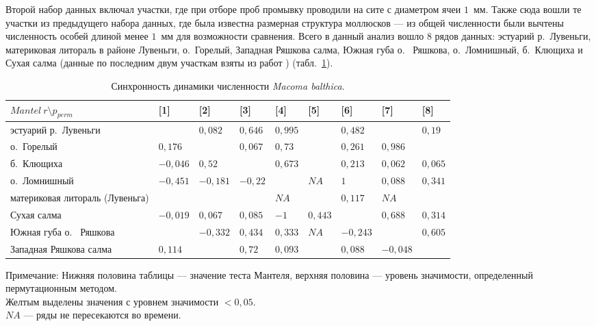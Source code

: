 Второй набор данных включал участки, где при отборе проб промывку проводили на сите с диаметром ячеи $1$~мм.
Также сюда вошли те участки из предыдущего набора данных, где была известна размерная структура моллюсков --- из общей численности были вычтены численность особей длиной менее $1$~мм для возможности сравнения.
Всего в данный анализ вошло 8 рядов данных: эстуарий р.~Лувеньги, материковая литораль в районе Лувеньги, о.~Горелый, Западная Ряшкова салма, Южная губа о.~ Ряшкова, о.~Ломнишный, б.~Клющиха и Сухая салма (данные по последним двум участкам взяты из работ \cite{Maximovich_et_al_1991, Maximovich_Gerasimova_2004, Gerasimova_Maximovich_2013}) (табл.~\ref{tab:Mantel_dynamic_N2}).
	\begin{table}[p]
	\caption{Синхронность динамики численности {\it Macoma balthica}.}
	\label{tab:Mantel_dynamic_N2}
        \begin{tabularx}{\textwidth}{|p{}|*{8}{X|}} \hline
	$Mantel \ r \setminus p_{perm}$ & [1] & [2] & [3] & [4] & [5] & [6] & [7] & [8]
	\\ \hline
	[1] эстуарий р.~Лувеньги & & $0,082$ & $0,646$ & $0,995$ & \cellcolor{yellow}{$0,029$} & $0,482$ & \cellcolor{yellow}{$0,013$} & $0,19$
	\\ \hline
	[2] о.~Горелый & $0,176$ &  & $0,067$ & $0,73$ & \cellcolor{yellow}{$0,001$} & $0,261$ & $0,986$ & \cellcolor{yellow}{$0,001$}
	\\ \hline
	[3] б.~Клющиха & $-0,046$ & $0,52$ &  & $0,673$ & \cellcolor{yellow}{$0,034$} & $0,213$ & $0,062$ & $0,065$
	\\ \hline
	[4] о.~Ломнишный & $-0,451$ & $-0,181$ & $-0,22$ &  & $NA$ & $1$ & $0,088$ & $0,341$
	\\ \hline
	[5] материковая литораль (Лувеньга) & \cellcolor{yellow}{$0,32$} & \cellcolor{yellow}{$0,862$} & \cellcolor{yellow}{$0,577$} & $NA$ &  & $0,117$ & $NA$ & \cellcolor{yellow}{$0,006$}
	\\ \hline
	[6]Сухая салма & $-0,019$ & $0,067$ & $0,085$ & $-1$ & $0,443$ &  & $0,688$ & $0,314$
	\\ \hline
	[7] Южная губа о.~ Ряшкова & \cellcolor{yellow}{$0,419$} & $-0,332$ & $0,434$ & $0,333$ & $NA$ & $-0,243$ &  & $0,605$
	\\ \hline
	[8] Западная Ряшкова салма & $0,114$ & \cellcolor{yellow}{$0,86$} & $0,72$ & $0,093$ & \cellcolor{yellow}{$0,755$} & $0,088$ & $-0,048$ & 
	\\ \hline
	\end{tabularx}
	   {\footnotesize Примечание: Нижняя половина таблицы --- значение теста Мантеля, верхняя половина --- уровень значимости, определенный пермутационным методом. \\
Желтым выделены значения с уровнем значимости $< 0,05$. \\
$NA$ --- ряды не пересекаются во времени.}
	\end{table}
